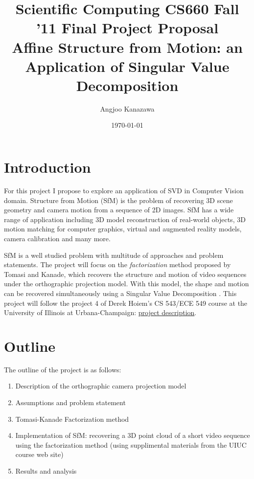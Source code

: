 \documentclass[a4paper]{article}
\begin{document}
\title{Scientific Computing CS660 Fall '11 Final Project Proposal\\ Affine Structure from Motion: an Application of Singular Value Decomposition}
\author{Angjoo Kanazawa}
\date{\today}
\maketitle

\section{Introduction}
For this project I propose to explore an application of SVD in Computer
Vision domain. Structure from Motion (SfM) is the problem of
recovering 3D scene geometry and camera motion from a sequence of 2D
images. SfM has a wide range of application including 3D model
reconstruction of real-world objects, 3D motion matching for computer
graphics, virtual and augmented reality models, camera calibration and
many more.


SfM is a well studied problem with multitude of
approaches and problem statements. The project will focus on the
\emph{factorization} method proposed by Tomasi and Kanade, which recovers the structure and motion of
video sequences under the orthographic projection model. With this
model, the shape and motion can be recovered simultaneously using a
Singular Value Decomposition \cite{Tomasi}. This project will follow the project 4 of Derek Hoiem's CS 543/ECE 549
course at the University of Illinois at Urbana-Champaign:
\href{http://www.cs.illinois.edu/class/sp11/cs543/hw/hw4.pdf}{project
  description}. 


\section{Outline}
The outline of the project is as follows:
\begin{enumerate}
\item Description of the orthographic camera projection model
\item Assumptions and problem statement
\item Tomasi-Kanade Factorization method
\item Implementation of SfM: recovering a 3D point cloud of a short
  video sequence using the factorization method (using supplimental materials from the UIUC course web site)
\item Results and analysis
\end{enumerate}
\end{document}
